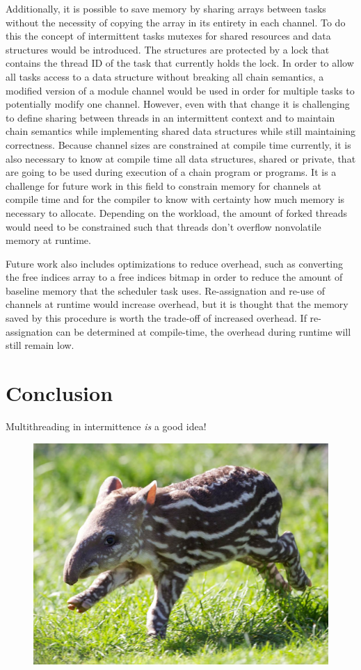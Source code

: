\documentclass[11pt]{sensys-proc}
\begin{document}
Additionally, it is possible to save memory by sharing arrays between tasks
without the necessity of copying the array in its entirety in each channel.  To
do this the concept of intermittent tasks mutexes for shared resources and data
structures would be introduced.  The structures are protected by a lock that
contains the thread ID of the task that currently holds the lock.  In order to
allow all tasks access to a data structure without breaking all chain semantics,
a modified version of a module channel would be used in order for multiple tasks
to potentially modify one channel.  However, even with that change it is
challenging to define sharing between threads in an intermittent context and to
maintain chain semantics while implementing shared data structures while still
maintaining correctness.  Because channel sizes are constrained at compile time
currently, it is also necessary to know at compile time all data structures,
shared or private, that are going to be used during execution of a chain program
or programs.  It is a challenge for future work in this field to constrain
memory for channels at compile time and for the compiler to know with certainty
how much memory is necessary to allocate. Depending on the workload, the amount
of forked threads would need to be constrained such that threads don't overflow
nonvolatile memory at runtime.

Future work also includes optimizations to reduce overhead, such as converting
the free indices array to a free indices bitmap in order to reduce the amount of
baseline memory that the scheduler task uses.  Re-assignation and re-use of
channels at runtime would increase overhead, but it is thought that the memory
saved by this procedure is worth the trade-off of increased overhead.  If
re-assignation can be determined at compile-time, the overhead during runtime
will still remain low.

\section{Conclusion}
Multithreading in intermittence {\em is} a good idea!

\begin{figure}[hb]
  \centering
  \includegraphics[width=0.9\columnwidth]{figs/tapir}
\end{figure}


\balance

\end{document}
